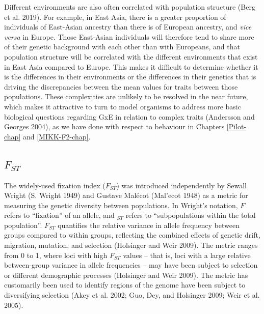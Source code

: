\documentclass[
]{book}
\begin{document}
Different environments are also often correlated with population structure (Berg et al. 2019). For example, in East Asia, there is a greater proportion of individuals of East-Asian ancestry than there is of European ancestry, and \emph{vice versa} in Europe. Those East-Asian individuals will therefore tend to share more of their genetic background with each other than with Europeans, and that population structure will be correlated with the different environments that exist in East Asia compared to Europe. This makes it difficult to determine whether it is the differences in their environments or the differences in their genetics that is driving the discrepancies between the mean values for traits between those populations. These complexities are unlikely to be resolved in the near future, which makes it attractive to turn to model organisms to address more basic biological questions regarding GxE in relation to complex traits (Andersson and Georges 2004), as we have done with respect to behaviour in Chapters \ref{Pilot-chap} and \ref{MIKK-F2-chap}.

\hypertarget{Fst-descr}{%
\subsection{\texorpdfstring{\(F_{ST}\)}{F\_\{ST\}}}\label{Fst-descr}}

The widely-used fixation index (\(F_{ST}\)) was introduced independently by Sewall Wright (S. Wright 1949) and Gustave Malécot (Mal'ecot 1948) as a metric for measuring the genetic diversity between populations. In Wright's notation, \(F\) refers to ``fixation'' of an allele, and \(_{ST}\) refers to ``subpopulations within the total population''. \(F_{ST}\) quantifies the relative variance in allele frequency between groups compared to within groups, reflecting the combined effects of genetic drift, migration, mutation, and selection (Holsinger and Weir 2009). The metric ranges from 0 to 1, where loci with high \(F_{ST}\) values -- that is, loci with a large relative between-group variance in allele frequencies -- may have been subject to selection or different demographic processes (Holsinger and Weir 2009). The metric has customarily been used to identify regions of the genome have been subject to diversifying selection (Akey et al. 2002; Guo, Dey, and Holsinger 2009; Weir et al. 2005).
\end{document}
